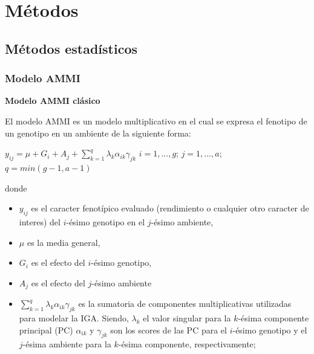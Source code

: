 
\chapter{Métodos}
\section{Métodos estadísticos}

\subsection{Modelo AMMI}

\textbf{Modelo AMMI clásico}

El modelo AMMI es un modelo multiplicativo en el cual se expresa el fenotipo de un genotipo en un ambiente de la siguiente forma:
\begin{center}
$y_{ij}= \mu +G_i + A_j + \sum_{k=1}^q \lambda_k \alpha_{ik} \gamma_{jk}$ \hspace{0.5cm} $ i=1,...,g$;\hspace{0.15cm} $ j=1,...,a$;\hspace{0.15cm} $q=min(g-1,a-1)$
\end{center} 
donde 
\begin{itemize}
\item $y_{ij}$ es el caracter fenotípico evaluado (rendimiento o cualquier otro caracter de interes) del $i$-ésimo genotipo en el $j$-ésimo ambiente,
\item $\mu$ es la media general,
\item  $G_i$ es el efecto del $i$-ésimo genotipo,
\item $A_j$ es el efecto del $j$-ésimo ambiente
\item $\sum_{k=1}^q \lambda_k \alpha_{ik} \gamma_{jk}$ es la sumatoria de componentes multiplicativas utilizadas para modelar la IGA. Siendo, $\lambda_k$ el valor singular para la  $k$-ésima componente principal (PC) $\alpha_{ik}$ y $\gamma_{jk}$ son los scores de las PC para el $i$-ésimo genotipo y el $j$-ésima ambiente para la $k$-ésima componente, respectivamente;
\end{itemize}

